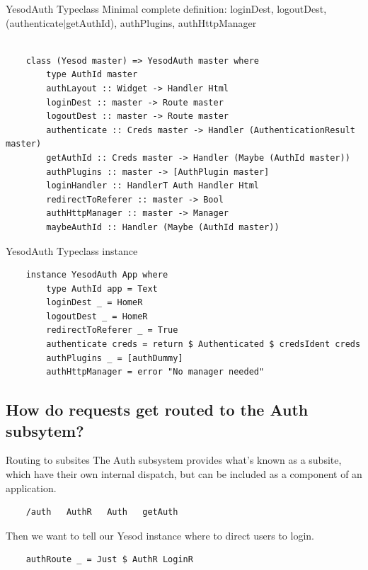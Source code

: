 \documentclass[pdf]{beamer}
\begin{document}
\begin{frame}[fragile]{YesodAuth Typeclass}
  Minimal complete definition: loginDest, logoutDest,
  (authenticate$|$getAuthId), authPlugins, authHttpManager \\
  \\
  \begin{verbatim}
    class (Yesod master) => YesodAuth master where
        type AuthId master
        authLayout :: Widget -> Handler Html
        loginDest :: master -> Route master
        logoutDest :: master -> Route master
        authenticate :: Creds master -> Handler (AuthenticationResult master)
        getAuthId :: Creds master -> Handler (Maybe (AuthId master))
        authPlugins :: master -> [AuthPlugin master]
        loginHandler :: HandlerT Auth Handler Html
        redirectToReferer :: master -> Bool
        authHttpManager :: master -> Manager
        maybeAuthId :: Handler (Maybe (AuthId master))
  \end{verbatim}
\end{frame}

\begin{frame}[fragile]{YesodAuth Typeclass instance}
  \begin{verbatim}
    instance YesodAuth App where
        type AuthId app = Text
        loginDest _ = HomeR
        logoutDest _ = HomeR
        redirectToReferer _ = True
        authenticate creds = return $ Authenticated $ credsIdent creds
        authPlugins _ = [authDummy]
        authHttpManager = error "No manager needed"
  \end{verbatim}
\end{frame}

\subsection{How do requests get routed to the Auth subsytem?}
\begin{frame}[fragile]{Routing to subsites}
  The Auth subsystem provides what's known as a subsite, which have
  their own internal dispatch, but can be included as a component of
  an application.
  \pause
  \begin{verbatim}
    /auth   AuthR   Auth   getAuth
  \end{verbatim}
  \pause
  Then we want to tell our Yesod instance where to direct users to login.
  \begin{verbatim}
    authRoute _ = Just $ AuthR LoginR
  \end{verbatim}
\end{frame}
\end{document}
